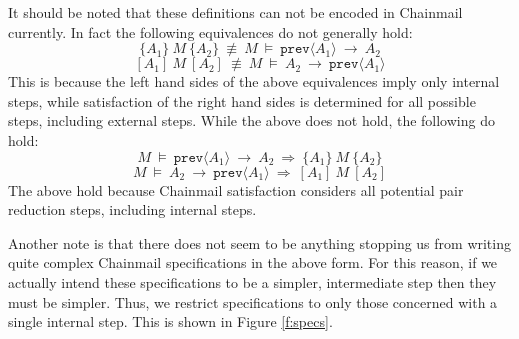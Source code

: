 \documentclass[12pt]{article}
\begin{document}
	It should be noted that these definitions can not be encoded in Chainmail currently. In fact the following equivalences do not generally hold:
	$$\{A_1\}\ M\ \{A_2\}\ \not\equiv\ M\ \vDash\ \texttt{prev}\langle A_1 \rangle\ \longrightarrow\ A_2$$
	$$[A_1]\ M\ [A_2]\ \not\equiv\ M\ \vDash\ A_2\ \longrightarrow\ \texttt{prev}\langle A_1 \rangle$$
	This is because the left hand sides of the above equivalences imply only internal steps, while satisfaction of the right hand sides 
	is determined for all possible steps, including external steps. While the above does not hold, the following do hold:
	$$M\ \vDash\ \texttt{prev}\langle A_1 \rangle\ \longrightarrow\ A_2\ \Rightarrow\ \{A_1\}\ M\ \{A_2\}$$
	$$M\ \vDash\ A_2\ \longrightarrow\ \texttt{prev}\langle A_1 \rangle\ \Rightarrow\ [A_1]\ M\ [A_2]$$
	The above hold because Chainmail satisfaction considers all potential pair reduction steps, including internal steps.
	
	Another note is that there does not seem to be anything stopping us from writing quite complex Chainmail specifications 
	in the above form. For this reason, if we actually intend these specifications to be a simpler, intermediate step then they 
	must be simpler. Thus, we restrict specifications to only those concerned with a single internal step. This is shown in Figure \ref{f:specs}.
	
\end{document}
